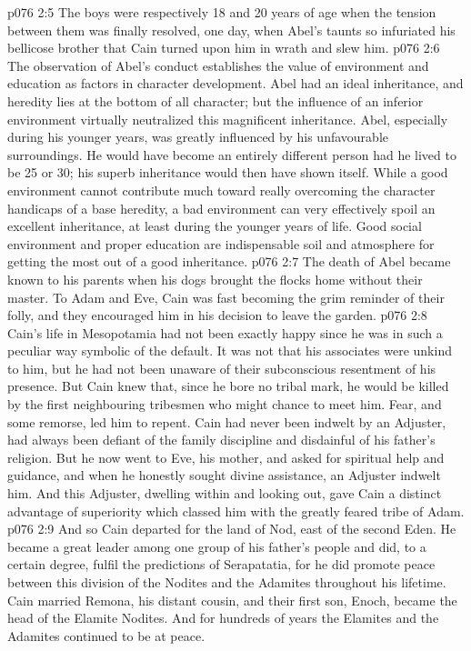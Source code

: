 \vs p076 2:5 The boys were respectively 18 and 20 years of age when the tension between them was finally resolved, one day, when Abel’s taunts so infuriated his bellicose brother that Cain turned upon him in wrath and slew him.
\vs p076 2:6 \pc The observation of Abel’s conduct establishes the value of environment and education as factors in character development. Abel had an ideal inheritance, and heredity lies at the bottom of all character; but the influence of an inferior environment virtually neutralized this magnificent inheritance. Abel, especially during his younger years, was greatly influenced by his unfavourable surroundings. He would have become an entirely different person had he lived to be 25 or 30; his superb inheritance would then have shown itself. While a good environment cannot contribute much toward really overcoming the character handicaps of a base heredity, a bad environment can very effectively spoil an excellent inheritance, at least during the younger years of life. Good social environment and proper education are indispensable soil and atmosphere for getting the most out of a good inheritance.
\vs p076 2:7 \pc The death of Abel became known to his parents when his dogs brought the flocks home without their master. To Adam and Eve, Cain was fast becoming the grim reminder of their folly, and they encouraged him in his decision to leave the garden.
\vs p076 2:8 Cain’s life in Mesopotamia had not been exactly happy since he was in such a peculiar way symbolic of the default. It was not that his associates were unkind to him, but he had not been unaware of their subconscious resentment of his presence. But Cain knew that, since he bore no tribal mark, he would be killed by the first neighbouring tribesmen who might chance to meet him. Fear, and some remorse, led him to repent. Cain had never been indwelt by an Adjuster, had always been defiant of the family discipline and disdainful of his father’s religion. But he now went to Eve, his mother, and asked for spiritual help and guidance, and when he honestly sought divine assistance, an Adjuster indwelt him. And this Adjuster, dwelling within and looking out, gave Cain a distinct advantage of superiority which classed him with the greatly feared tribe of Adam.
\vs p076 2:9 And so Cain departed for the land of Nod, east of the second Eden. He became a great leader among one group of his father’s people and did, to a certain degree, fulfil the predictions of Serapatatia, for he did promote peace between this division of the Nodites and the Adamites throughout his lifetime. Cain married Remona, his distant cousin, and their first son, Enoch, became the head of the Elamite Nodites. And for hundreds of years the Elamites and the Adamites continued to be at peace.
